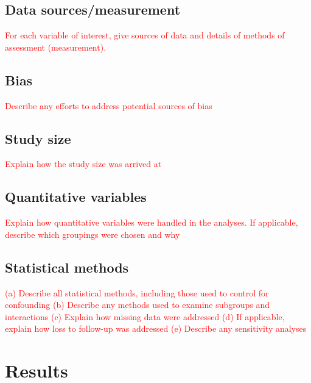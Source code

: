 \documentclass[a4paper,12pt]{article}
\begin{document}
\subsection{Data sources/measurement} \textcolor{red}{For each variable of interest, give sources of data and details of methods of assessment (measurement).}
\subsection{Bias} \textcolor{red}{Describe any efforts to address potential sources of bias}
\subsection{Study size} \textcolor{red}{ Explain how the study size was arrived at}
\subsection{Quantitative variables}\textcolor{red}{ Explain how quantitative variables were handled in the analyses. If applicable, describe which groupings were chosen and why}
\subsection{Statistical methods}\textcolor{red}{
(a) Describe all statistical methods, including those used to control for confounding
(b) Describe any methods used to examine subgroups and interactions
(c) Explain how missing data were addressed
(d) If applicable, explain how loss to follow-up was addressed
(e) Describe any sensitivity analyses}
\section{Results}
\end{document}
